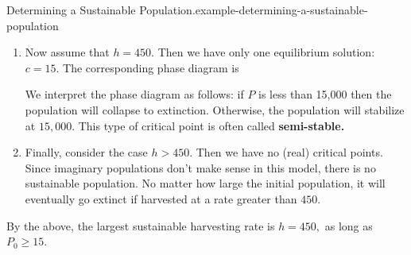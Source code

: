 \documentclass[10pt,]{book}
\newcommand{\terminology}[1]{\textbf{#1}}
\numberwithin{equation}{section}
\newcommand{\dv}[3][]{\dfrac{d^{#1} #2}{d #3^{#1}}}
\newcommand{\gt}{>}
\begin{document}
\begin{example}{Determining a Sustainable Population.}{example-determining-a-sustainable-population}
\begin{enumerate}
\begin{figure}
{
}
\end{figure}
\hypertarget{p-764}{}%
So we see that \(c_{1}\) is unstable while \(c_{2}\) is stable. In particular, as long as \(P\geq c_{1} = 15 - \sqrt{3600 - 8h}\), then the rate of harvesting is sustainable.%
\item\hypertarget{li-66}{}\hypertarget{p-765}{}%
Now assume that \(h = 450\). Then we have only one equilibrium solution: \(c = 15\). The corresponding phase diagram is%
\begin{figure}
\centering
{
}
\end{figure}
\hypertarget{p-766}{}%
We interpret the phase diagram as follows: if \(P\) is less than \hypertarget{p-767}{}%
15,000%
 then the population will collapse to extinction. Otherwise, the population will stabilize at \(15,000\). This type of critical point is often called \terminology{semi-stable.}%
\item\hypertarget{li-67}{}\hypertarget{p-768}{}%
Finally, consider the case \(h \gt 450\). Then we have no (real) critical points. Since imaginary populations don't make sense in this model, there is no sustainable population. No matter how large the initial population, it will eventually go extinct if harvested at a rate greater than \(450\).%
\end{enumerate}
\hypertarget{p-769}{}%
By the above, the largest sustainable harvesting rate is \(h = 450,\) as long as \(P_{0}\geq 15\).%
\end{example}
%
%
\typeout{************************************************}
\typeout{************************************************}
%
\end{document}
